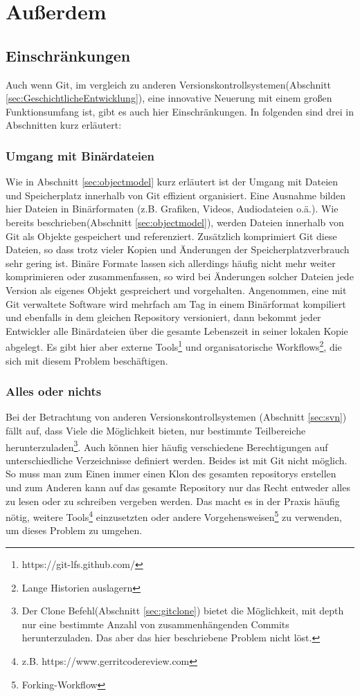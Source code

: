 \chapter{Außerdem}\label{cha:lookout}
\section{Einschränkungen}\label{sec:problems}
Auch wenn Git, im vergleich zu anderen Versionskontrollsystemen(Abschnitt
\ref{sec:GeschichtlicheEntwicklung}), eine innovative Neuerung mit einem großen
Funktionsumfang ist, gibt es auch hier Einschränkungen. In folgenden sind drei
in Abschnitten kurz erläutert:

\subsection{Umgang mit Binärdateien}\label{sec:binaries}
Wie in Abschnitt \ref{sec:objectmodel} kurz erläutert ist der Umgang mit
Dateien und Speicherplatz innerhalb von Git effizient organisiert. Eine
Ausnahme bilden hier Dateien in Binärformaten (z.B.  Grafiken, Videos,
Audiodateien o.ä.). Wie bereits beschrieben(Abschnitt \ref{sec:objectmodel}),
werden Dateien innerhalb von Git als Objekte gespeichert und referenziert.
Zusätzlich komprimiert Git diese Dateien, so dass trotz vieler Kopien und
Änderungen der Speicherplatzverbrauch sehr gering ist. Binäre Formate lassen
sich allerdings häufig nicht mehr weiter komprimieren oder zusammenfassen, so
wird bei Änderungen solcher Dateien jede Version als eigenes Objekt
gespreichert und vorgehalten. Angenommen, eine mit Git verwaltete Software wird
mehrfach am Tag in einem Binärformat kompiliert und ebenfalls in dem gleichen
Repository versioniert, dann bekommt jeder Entwickler alle Binärdateien über
die gesamte Lebenszeit in seiner lokalen Kopie abgelegt.  Es gibt hier aber
externe Tools\footnote{https://git-lfs.github.com/} und organisatorische
Workflows\footnote{Lange Historien auslagern\cite[S.~235-244]{gitwf}}, die sich
mit diesem Problem beschäftigen.\cite[S.~300]{gitwf}

\subsection{Alles oder nichts}
Bei der Betrachtung von anderen Versionskontrollsystemen (Abschnitt
\ref{sec:svn}) fällt auf, dass Viele die Möglichkeit bieten, nur bestimmte
Teilbereiche herunterzuladen\footnote{Der Clone Befehl(Abschnitt
\ref{sec:gitclone}) bietet die Möglichkeit, mit \-{}\-{}depth nur eine bestimmte
Anzahl von zusammenhängenden Commits herunterzuladen. Das aber das hier
beschriebene Problem nicht löst.\cite[S.~244]{gitwf}}. Auch können hier häufig
verschiedene Berechtigungen auf unterschiedliche Verzeichnisse definiert werden.
Beides ist mit Git nicht möglich. So muss man zum Einen immer einen Klon des
gesamten \glspl{repository} erstellen und zum Anderen kann auf das gesamte
Repository nur das Recht entweder alles zu lesen oder zu schreiben vergeben
werden. Das macht es in der Praxis häufig nötig, weitere Tools\footnote{z.B.
https://www.gerritcodereview.com} einzusetzten oder andere
Vorgehensweisen\footnote{Forking-Workflow\cite[S.~163-173]{gitwf}} zu verwenden,
um dieses Problem zu umgehen.\cite[300-302]{gitwf}

